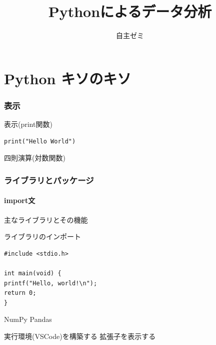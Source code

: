 \documentclass[dvipdfmx, leqno]{jsreport}
\title{Pythonによるデータ分析}
\author{}
\date{自主ゼミ}
\begin{document}
\maketitle
\tableofcontents


\part{Python キソのキソ}
\section{表示}

    表示(print関数)
\begin{lstlisting}[caption= Hello world!, label= lst:Hello World!]
    print("Hello World")
\end{lstlisting}


    四則演算(対数関数)






\section{ライブラリとパッケージ}
\subsection{import文}
    主なライブラリとその機能

    ライブラリのインポート
\begin{lstlisting}[caption=サンプルプログラム,label=lst:sample]
#include <stdio.h>
        
int main(void) {
printf("Hello, world!\n");
return 0;
}
\end{lstlisting}
        
    NumPy
    Pandas




    実行環境(VSCode)を構築する
    拡張子を表示する
\end{document}
